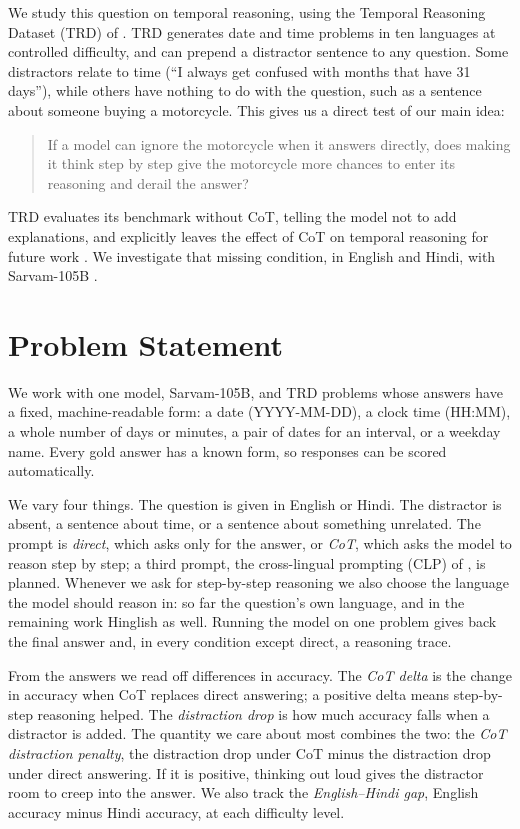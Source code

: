 \documentclass[11pt]{article}
\begin{document}
We study this question on temporal reasoning, using the Temporal Reasoning Dataset (TRD) of \citet{mazzia-etal-2026-benchmarking}. TRD generates date and time problems in ten languages at controlled difficulty, and can prepend a distractor sentence to any question. Some distractors relate to time (``I always get confused with months that have 31 days''), while others have nothing to do with the question, such as a sentence about someone buying a motorcycle. This gives us a direct test of our main idea:
\begin{quote}
If a model can ignore the motorcycle when it answers directly, does making it think step by step give the motorcycle more chances to enter its reasoning and derail the answer?
\end{quote}
TRD evaluates its benchmark without CoT, telling the model not to add explanations, and explicitly leaves the effect of CoT on temporal reasoning for future work \citep{mazzia-etal-2026-benchmarking}. We investigate that missing condition, in English and Hindi, with Sarvam-105B \citep{sarvam-2026-models}.

\section{Problem Statement}
\label{sec:problem}

We work with one model, Sarvam-105B, and TRD problems whose answers have a fixed, machine-readable form: a date (YYYY-MM-DD), a clock time (HH:MM), a whole number of days or minutes, a pair of dates for an interval, or a weekday name. Every gold answer has a known form, so responses can be scored automatically.

We vary four things. The question is given in English or Hindi. The distractor is absent, a sentence about time, or a sentence about something unrelated. The prompt is \emph{direct}, which asks only for the answer, or \emph{CoT}, which asks the model to reason step by step; a third prompt, the cross-lingual prompting (CLP) of \citet{qin-etal-2023-cross}, is planned. Whenever we ask for step-by-step reasoning we also choose the language the model should reason in: so far the question's own language, and in the remaining work Hinglish as well. Running the model on one problem gives back the final answer and, in every condition except direct, a reasoning trace.

From the answers we read off differences in accuracy. The \emph{CoT delta} is the change in accuracy when CoT replaces direct answering; a positive delta means step-by-step reasoning helped. The \emph{distraction drop} is how much accuracy falls when a distractor is added. The quantity we care about most combines the two: the \emph{CoT distraction penalty}, the distraction drop under CoT minus the distraction drop under direct answering. If it is positive, thinking out loud gives the distractor room to creep into the answer. We also track the \emph{English--Hindi gap}, English accuracy minus Hindi accuracy, at each difficulty level.
\end{document}
